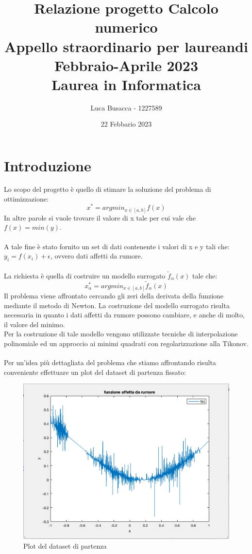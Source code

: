 \documentclass{article}
\title{Relazione progetto Calcolo numerico\\Appello straordinario per laureandi Febbraio-Aprile 2023\\Laurea in Informatica}
\date{22 Febbario 2023}
\author{Luca Busacca - 1227589}
\begin{document}
\maketitle
\vfill

{\hypersetup{linkcolor=black}
\renewcommand\contentsname{Indice}
\tableofcontents
}
\hfill
{\hypersetup{linkcolor=black}
\renewcommand{\listfigurename}{Elenco delle figure}
\listoffigures
}

\clearpage

\section{Introduzione}
Lo scopo del progetto è quello di stimare la soluzione del problema di ottimizzazione:
\[x^{*} = argmin_{x\in[a,b]}{f(x)}\]
In altre parole si vuole trovare il valore di x tale per cui vale che $f(x) = min(y)$.\\\\
A tale fine è stato fornito un set di dati contenente i valori di x e y tali che: $y_{i} = f(x_{i})+\epsilon$, ovvero dati affetti da rumore.\\\\
La richiesta è quella di costruire un modello surrogato $\widetilde f_{\alpha}(x)$ tale che:
\[x^{*}_{\alpha}=argmin_{x\in[a,b]}{\widetilde f_{\alpha}(x)}\]
Il problema viene affrontato cercando gli zeri della derivata della funzione mediante il metodo di Newton. La costruzione del modello surrogato risulta necessaria in quanto i dati affetti da rumore possono cambiare, e anche di molto, il valore del minimo.\\
Per la costruzione di tale modello vengono utilizzate tecniche di interpolazione polinomiale ed un approccio ai minimi quadrati con regolarizzazione alla Tikonov.\\\\
Per un'idea più dettagliata del problema che stiamo affrontando risulta conveniente effettuare un plot del dataset di partenza fissato:
\begin{figure}[h]
    \centering
    \label{fig:startinDataSet}
    \includegraphics[width=1\textwidth]{images/funzione.png}
    \caption{Plot del dataset di partenza}
\end{figure}
\end{document}
